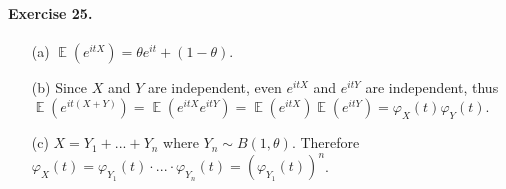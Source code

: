 \documentclass[12pt,a4paper]{report}
\theoremstyle{definition}
\theoremstyle{num.custom-title}
\DeclareMathOperator{\E}{\mathbb{E}}
\renewcommand{\phi}{\varphi}
\renewcommand{\1}{\mathbbm{1}}
\begin{document}
\paragraph{Exercise 25.}
\begin{itemize}
\item[(a)] $\E \left( e^{itX} \right) = \theta e^{it} + (1-\theta)$.
\item[(b)] Since $X$ and $Y$ are independent, even $e^{itX}$ and $e^{itY}$ are independent, thus $\E \left( e^{it(X+Y)} \right) = \E \left( e^{itX}e^{itY} \right) = \E \left( e^{itX} \right) \E \left( e^{itY} \right) = \phi_X(t) \phi_Y(t)$.
\item[(c)] $X= Y_1 + ... + Y_n$ where $Y_n \sim B(1,\theta)$. Therefore $\phi_X(t) = \phi_{Y_1}(t) \cdot ... \cdot \phi_{Y_n}(t) = \left( \phi_{Y_1}(t) \right)^n$.
\end{itemize}
\end{document}
